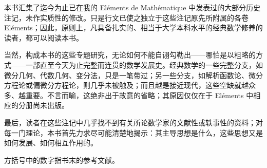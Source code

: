 
本书汇集了迄今为止已在我的 Eléments de Mathématique 中发表过的大部分历史注记，未作实质性的修改。只是行文已使之独立于这些注记原先所附属的各卷 Eléments；因此，原则上，凡具备扎实的、相当于大学本科水平的经典数学修养的读者，都可以阅读本书。

当然，构成本书的这些专题研究，无论如何不能自诩勾勒出——哪怕是以粗略的方式——一部直至今天为止完整而连贯的数学发展史。经典数学的一些完整分支，如微分几何、代数几何、变分法，只是一笔带过；另一些分支，如解析函数论、微分方程论或偏微分方程论，则几乎未被触及；而且越是接近现代，这些空缺就越众多、越重要。不言而喻，这绝非出于故意的省略；其原因仅仅在于 Eléments 中相应的分册尚未出版。

最后，读者在这些注记中几乎找不到有关所论数学家的文献性或轶事性的资料；对每一门理论，本书首先力求尽可能清楚地揭示：其主导思想是什么，这些思想又是如何发展、如何相互作用的。

方括号中的数字指书末的参考文献。

\tableofcontents
\mainmatter

